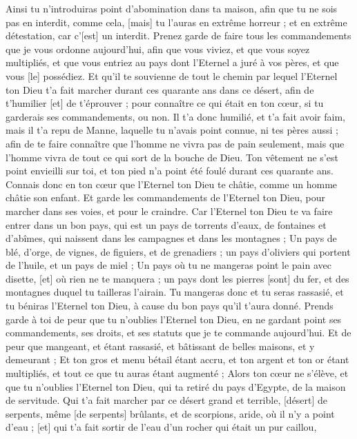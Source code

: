 \begin{multicols}{2}
Ainsi tu n'introduiras point d'abomination dans ta maison, afin que tu ne sois pas en interdit, comme cela, [mais] tu l'auras en extrême horreur ; et en extrême détestation, car c'[est] un interdit.
\VerseOne{}Prenez garde de faire tous les commandements que je vous ordonne aujourd'hui, afin que vous viviez, et que vous soyez multipliés, et que vous entriez au pays dont l'Eternel a juré à vos pères, et que vous [le] possédiez.
Et qu'il te souvienne de tout le chemin par lequel l'Eternel ton Dieu t'a fait marcher durant ces quarante ans dans ce désert, afin de t'humilier [et] de t'éprouver ; pour connaître ce qui était en ton cœur, si tu garderais ses commandements, ou non.
Il t'a donc humilié, et t'a fait avoir faim, mais il t'a repu de Manne, laquelle tu n'avais point connue, ni tes pères aussi ; afin de te faire connaître que l'homme ne vivra pas de pain seulement, mais que l'homme vivra de tout ce qui sort de la bouche de Dieu.
Ton vêtement ne s'est point envieilli sur toi, et ton pied n'a point été foulé durant ces quarante ans.
Connais donc en ton cœur que l'Eternel ton Dieu te châtie, comme un homme châtie son enfant.
Et garde les commandements de l'Eternel ton Dieu, pour marcher dans ses voies, et pour le craindre.
Car l'Eternel ton Dieu te va faire entrer dans un bon pays, qui est un pays de torrents d'eaux, de fontaines et d'abîmes, qui naissent dans les campagnes et dans les montagnes ;
Un pays de blé, d'orge, de vignes, de figuiers, et de grenadiers ; un pays d'oliviers qui portent de l'huile, et un pays de miel ;
Un pays où tu ne mangeras point le pain avec disette, [et] où rien ne te manquera ; un pays dont les pierres [sont] du fer, et des montagnes duquel tu tailleras l'airain.
Tu mangeras donc et tu seras rassasié, et tu béniras l'Eternel ton Dieu, à cause du bon pays qu'il t'aura donné.
Prends garde à toi de peur que tu n'oublies l'Eternel ton Dieu, en ne gardant point ses commandements, ses droits, et ses statuts que je te commande aujourd'hui.
Et de peur que mangeant, et étant rassasié, et bâtissant de belles maisons, et y demeurant ;
Et ton gros et menu bétail étant accru, et ton argent et ton or étant multipliés, et tout ce que tu auras étant augmenté ;
Alors ton cœur ne s'élève, et que tu n'oublies l'Eternel ton Dieu, qui ta retiré du pays d'Egypte, de la maison de servitude.
Qui t'a fait marcher par ce désert grand et terrible, [désert] de serpents, même [de serpents] brûlants, et de scorpions, aride, où il n'y a point d'eau ; [et] qui t'a fait sortir de l'eau d'un rocher qui était un pur caillou,

\end{multicols}
